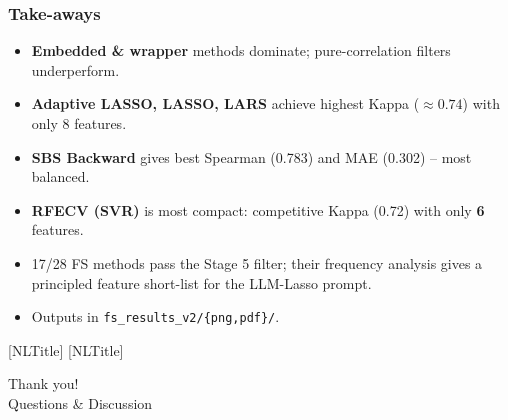 \documentclass[aspectratio=169]{beamer}
\begin{document}
\begin{frame}
    \frametitle{Take-aways}
    \begin{itemize}
        \item \textbf{Embedded \& wrapper} methods dominate; pure-correlation filters underperform.
        \item \textbf{Adaptive LASSO, LASSO, LARS} achieve highest Kappa ($\approx 0.74$) with only 8 features.
        \item \textbf{SBS Backward} gives best Spearman (0.783) and MAE (0.302) -- most balanced.
        \item \textbf{RFECV (SVR)} is most compact: competitive Kappa (0.72) with only \textbf{6} features.
        \item 17/28 FS methods pass the Stage 5 filter; their frequency analysis gives a
              principled feature short-list for the LLM-Lasso prompt.
        \item Outputs in \texttt{fs\_results\_v2/\{png,pdf\}/}.
    \end{itemize}
\end{frame}

{
[NLTitle]
[NLTitle]
\begin{frame}
    \begin{center}
        \vspace{1.5cm}
        {\Huge Thank you!}\\[0.6cm]
        {\large Questions \& Discussion}
    \end{center}
\end{frame}
}
\end{document}

